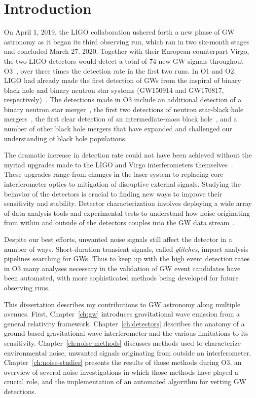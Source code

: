 \chapter{Introduction}

On April 1, 2019, the \ac{LIGO} collaboration ushered forth a new phase of \ac{GW} astronomy as it began its third observing run, which ran in two six-month stages and concluded March 27, 2020.
Together with their European counterpart Virgo, the two \ac{LIGO} detectors would detect a total of 74 new \ac{GW} signals throughout \ac{O3}~\citep{gwtc2, gwtc3}, over three times the detection rate in the first two runs.
In \ac{O1} and \ac{O2}, \ac{LIGO} had already made the first detection of \acp{GW} from the inspiral of binary black hole and binary neutron star systems (GW150914 and GW170817, respectively)~\citep{gw150914, gw170817}.
The detections made in \ac{O3} include an additional detection of a binary neutron star merger~\citep{gw190425}, the first two detections of neutron star-black hole mergers~\citep{nsbh_o3}, the first clear detection of an intermediate-mass black hole~\citep{gw190521}, and a number of other black hole mergers that have expanded and challenged our understanding of black hole populations.

The dramatic increase in detection rate could not have been achieved without the myriad upgrades made to the LIGO and Virgo interferometers themselves~\citep{Buikema_2020}.
These upgrades range from changes in the laser system to replacing core interferometer optics to mitigation of disruptive external signals.
Studying the behavior of the detectors is crucial to finding new ways to improve their sensitivity and stability.
Detector characterization involves deploying a wide array of data analysis tools and experimental tests to understand how noise originating from within and outside of the detectors couples into the \ac{GW} data stream~\citep{Davis_2019, Davis_2021}.

Despite our best efforts, unwanted noise signals still affect the detector in a number of ways.
Short-duration transient signals, called \textit{glitches}, impact analysis pipelines searching for \acp{GW}.
Thus to keep up with the high event detection rates in \ac{O3} many analyses necessary in the validation of \ac{GW} event candidates have been automated, with more sophisticated methods being developed for future observing runs.

This dissertation describes my contributions to \ac{GW} astronomy along multiple avenues. First, Chapter~\ref{ch:gw} introduces gravitational wave emission from a general relativity framework. Chapter~\ref{ch:detectors} describes the anatomy of a ground-based gravitational wave interferometer and the various limitations to its sensitivity. Chapter~\ref{ch:noise-methods} discusses methods used to characterize environmental noise, unwanted signals originating from outside an interferometer. Chapter~\ref{ch:noise-studies} presents the results of those methods during O3, an overview of several noise investigations in which those methods have played a crucial role, and the implementation of an automated algorithm for vetting \ac{GW} detections.

